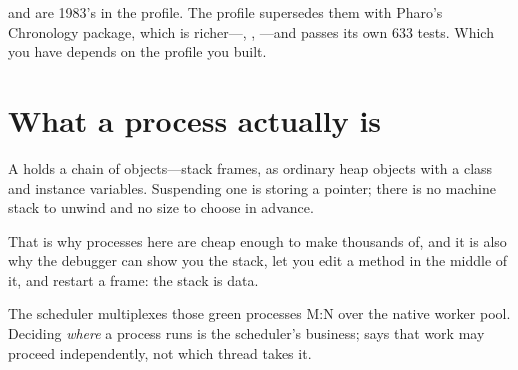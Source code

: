 \begin{stwarn}
 and  are 1983's in the  profile. The
 profile supersedes them with Pharo's Chronology package,
which is richer---, , ---and
passes its own 633 tests. Which you have depends on the profile you built.
\end{stwarn}

\section{What a process actually is}

A  holds a chain of  objects---stack frames, as
ordinary heap objects with a class and instance variables. Suspending one is
storing a pointer; there is no machine stack to unwind and no size to choose
in advance.

That is why processes here are cheap enough to make thousands of, and it is
also why the debugger can show you the stack, let you edit a method in the
middle of it, and restart a frame: the stack is data.

The scheduler multiplexes those green processes M:N over the native worker
pool. Deciding \emph{where} a process runs is the scheduler's business;
 says that work may proceed independently, not which thread
takes it.

